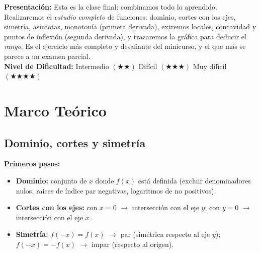 \documentclass[12pt, letterpaper]{article}
\begin{document}


\vspace{4pt}
\begin{cuadroinfo}
  \small
  \textbf{Presentación:} Esta es la clase final: combinamos todo lo aprendido. Realizaremos el \emph{estudio completo} de funciones: dominio, cortes con los ejes, simetría, asíntotas, monotonía (primera derivada), extremos locales, concavidad y puntos de inflexión (segunda derivada), y trazaremos la gráfica para deducir el \emph{rango}. Es el ejercicio más completo y desafiante del minicurso, y el que más se parece a un examen parcial.
  \\[6pt]
  \textbf{Nivel de Dificultad:}\quad
  \medio{} Intermedio $(\bigstar\bigstar)$ \quad
  \dificil{} Difícil $(\bigstar\bigstar\bigstar)$ \quad
  \muyDificil{} Muy difícil $(\bigstar\bigstar\bigstar\bigstar)$
\end{cuadroinfo}

\vspace{8pt}

\section{Marco Teórico}

\subsection{Dominio, cortes y simetría}

\begin{cuadroteoria}
  \textbf{Primeros pasos:}
  \begin{itemize}
    \item \textbf{Dominio:} conjunto de $x$ donde $f(x)$ está definida (excluir denominadores nulos, raíces de índice par negativas, logaritmos de no positivos).
    \item \textbf{Cortes con los ejes:} con $x=0$ $\to$ intersección con el eje $y$; con $y=0$ $\to$ intersección con el eje $x$.
    \item \textbf{Simetría:} $f(-x) = f(x)$ $\to$ par (simétrica respecto al eje $y$); $f(-x) = -f(x)$ $\to$ impar (respecto al origen).
  \end{itemize}
\end{cuadroteoria}
\end{document}
